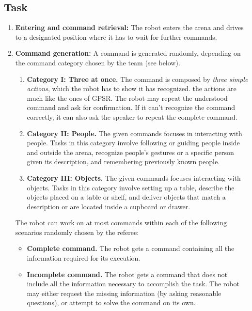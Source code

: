 \subsection{Task}

\begin{enumerate}
	\item \textbf{Entering and command retrieval:} The robot enters the arena and drives to a designated position where it has to wait for further commands. \\

	\item \textbf{Command generation:} A command is generated randomly, depending on the command category chosen by the team (see below). \\

	\begin{enumerate}
		\item \textbf{Category I: Three at once.} The command is composed by \textit{three simple actions}, which the robot has to show it has recognized. the actions are much like the ones of GPSR. The robot may repeat the understood command and ask for confirmation. If it can't recognize the command correctly, it can also ask the speaker to repeat the complete command.

		\item \textbf{Category II: People.} The given commands focuses in interacting with people. Tasks in this category involve following or guiding people inside and outside the arena, recognize people's gestures or a specific person given its description, and remembering previously known people.

		\item \textbf{Category III: Objects.} The given commands focuses interacting with objects. Tasks in this category involve setting up a table, describe the objects placed on a table or shelf, and deliver objects that match a description or are located inside a cupboard or drawer.
	\end{enumerate}

	The robot can work on at most \eegpsrMaxCmd commands within each of the following scenarios randomly chosen by the referee: \\

	\begin{itemize}
		\item \textbf{Complete command.} The robot gets a command containing all the information required for its execution.

		\item \textbf{Incomplete command.} The robot gets a command that does not include all the information necessary to accomplish the task. The robot may either request the missing information (by asking reasonable questions), or attempt to solve the command on its own.


\end{itemize}
\end{enumerate}
